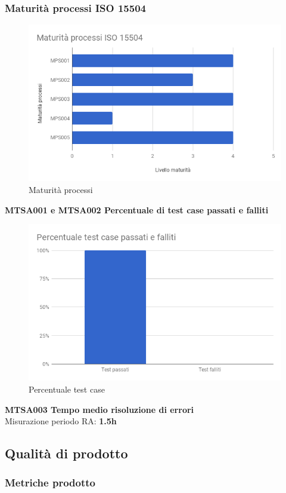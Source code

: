 \documentclass[PianoDiQualifica.tex]{subfiles}
\begin{document}
\subsubsection{Maturità processi ISO 15504}
\begin{figure}[H]
	\centering
	\includegraphics[width=0.9\linewidth]{RA/Processi}
	\caption{Maturità processi}
	\label{fig:processi}
\end{figure}

\textbf{MTSA001 e MTSA002 Percentuale di test case passati e falliti}
\begin{figure}[H]
	\centering
	\includegraphics[width=0.7\linewidth]{RA/MTSA001-2}
	\caption{Percentuale test case}
	\label{fig:mtsa001-2}
\end{figure}

\textbf{MTSA003 Tempo medio risoluzione di errori}\\
Misurazione periodo RA: \textbf{1.5h}\\

\newpage
\subsection{Qualità di prodotto}

\subsubsection{Metriche prodotto}
\end{document}
